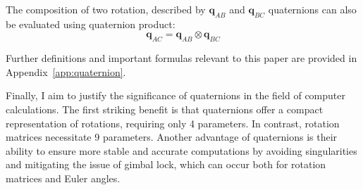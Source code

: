 The composition of two rotation, described by $\mathbf{q}_{AB}$ and $\mathbf{q}_{BC}$ quaternions can also be evaluated using quaternion product:
\begin{equation}
    \mathbf{q}_{AC}=\mathbf{q}_{AB}\otimes\mathbf{q}_{BC}
\end{equation}

Further definitions and important formulas relevant to this paper are provided in Appendix~\ref{app:quaternion}.

Finally, I aim to justify the significance of quaternions in the field of computer calculations. The first striking benefit is that quaternions offer a compact representation of rotations, requiring only 4 parameters. In contrast, rotation matrices necessitate  9 parameters. Another advantage of quaternions is their ability to ensure more stable and accurate computations by avoiding singularities and mitigating the issue of gimbal lock, which can occur both for rotation matrices and Euler angles.